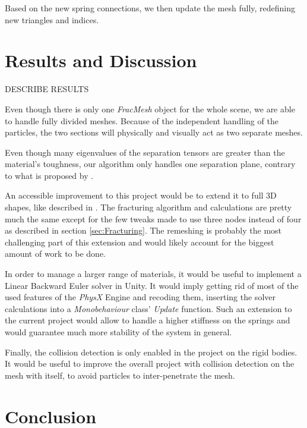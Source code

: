 \documentclass[tog]{acmsiggraph}
\begin{document}
Based on the new spring connections, we then update the mesh fully, redefining new triangles and indices. 

\section{Results and Discussion}

DESCRIBE RESULTS

Even though there is only one \textit{FracMesh} object for the whole scene, we are able to handle fully divided meshes. Because of the independent handling of the particles, the two sections will physically and visually act as two separate meshes. 

Even though many eigenvalues of the separation tensors are greater than the material's toughness, our algorithm only handles one separation plane, contrary to what is proposed by \cite{Obrien:1999:GMA}.

An accessible improvement to this project would be to extend it to full 3D shapes, like described in \cite{Obrien:1999:GMA}. The fracturing algorithm and calculations are pretty much the same except for the few tweaks made to use three nodes instead of four as described in section \ref{sec:Fracturing}. The remeshing is probably the most challenging part of this extension and would likely account for the biggest amount of work to be done. 

In order to manage a larger range of materials, it would be useful to implement a Linear Backward Euler solver in Unity. It would imply getting rid of most of the used features of the \textit{PhysX} Engine and recoding them, inserting the solver calculations into a \textit{Monobehaviour} class' \textit{Update} function. Such an extension to the current project would allow to handle a higher stiffness on the springs and would guarantee much more stability of the system in general. 

Finally, the collision detection is only enabled in the project on the rigid bodies. It would be useful to improve the overall project with collision detection on the mesh with itself, to avoid particles to inter-penetrate the mesh. 

\section{Conclusion}
\end{document}
